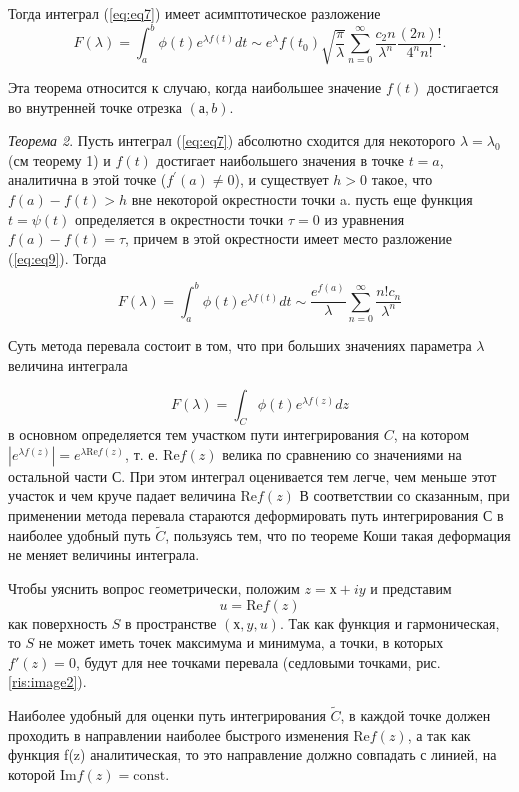 \documentclass[14pt]{extarticle}
\renewcommand{\Re}{\mathrm{Re}}
\renewcommand{\Im}{\mathrm{Im}}
\newcommand{\const}{\mathrm{const}}
\begin{document}
Тогда интеграл (\ref{eq:eq7}) имеет асимптотическое разложение
$$
F(\lambda)=\int_{a}^{b}\phi(t)e^{\lambda f(t)}dt \sim e^\lambda f(t_0) \sqrt{\frac{\pi}{\lambda}} \sum_{n=0}^{\infty}\frac{c_2n}{\lambda^n}\frac{(2n)!}{4^n n!}.
$$
  
Эта теорема относится к случаю, когда наибольшее значение $f(t)$ достигается во внутренней точке отрезка $(а, b)$. 

\textit{Теорема 2\label{th:th2}}. Пусть интеграл (\ref{eq:eq7}) абсолютно сходится для некоторого $\lambda = \lambda_0$ (см теорему 1) и $f(t)$ достигает наибольшего значения в точке $t=a$, аналитична в этой точке ($f^\prime(a) \neq 0$), и существует $h>0$ такое, что $f(a)-f(t)>h$ вне некоторой окрестности точки a. пусть еще функция $t=\psi(t)$ определяется в окрестности точки $\tau=0$ из уравнения $f(a) - f(t) = \tau$, причем в этой окрестности имеет место разложение (\ref{eq:eq9}). Тогда

\begin{equation}\label{eq:eq10}
F(\lambda) = \int_{a}^{b}\phi(t)e^{\lambda f(t)}dt \sim \frac{e^{f(a)}}{\lambda}\sum_{n=0}^{\infty}\frac{n! c_n}{\lambda^n}
\end{equation}
  
Суть метода перевала состоит в том, что при больших значениях параметра $\lambda$ величина интеграла
  
$$
F(\lambda) = \int_{C}^{}\phi(t)e^{\lambda f(z)}dz
$$
в основном определяется тем участком пути интегрирования $C$, на котором $|e^{\lambda f(z)}|=e^{\lambda \Re f(z)}$, т. е. $\Re f(z)$ велика по сравнению со значениями на остальной части $С$. При этом интеграл оценивается тем легче, чем меньше этот участок и чем круче падает величина $\Re f(z)$ В соответствии со сказанным, при применении метода перевала стараются деформировать путь интегрирования С в наиболее удобный путь $\widetilde{C}$, пользуясь тем, что по теореме Коши такая деформация не меняет величины интеграла.\cite{GSL:website}
  
Чтобы уяснить вопрос геометрически, положим $z = х + iy$ и представим
$$
u = \Re f(z)
$$
как поверхность $S$ в пространстве $(х, y, u)$. Так как функция и гармоническая, то $S$ не может иметь точек максимума и минимума, а точки, в которых $f'(z) = 0$, будут для нее точками перевала (седловыми точками, рис. \ref{ris:image2}).



Наиболее удобный для оценки путь интегрирования $\widetilde{C}$, в каждой точке должен проходить в направлении наиболее быстрого изменения $\Re f(z)$, а так как функция f(z) аналитическая, то это направление должно совпадать с линией, на которой $\Im f(z) = \const$. 
\end{document}
